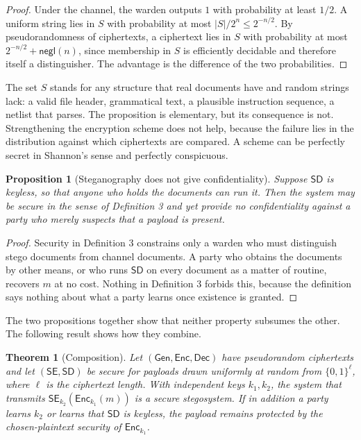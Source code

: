 \documentclass[11pt]{article}
\newtheorem{proposition}{Proposition}
\newtheorem{theorem}{Theorem}
\theoremstyle{definition}
\theoremstyle{remark}
\newcommand{\negl}{\mathsf{negl}}
\newcommand{\Enc}{\mathsf{Enc}}
\newcommand{\Dec}{\mathsf{Dec}}
\newcommand{\SE}{\mathsf{SE}}
\newcommand{\SD}{\mathsf{SD}}
\begin{document}
\begin{proof}
Under the channel, the warden outputs $1$ with probability at least $1/2$. A uniform string lies in $S$ with probability at most $|S|/2^n\le 2^{-n/2}$. By pseudorandomness of ciphertexts, a ciphertext lies in $S$ with probability at most $2^{-n/2}+\negl(n)$, since membership in $S$ is efficiently decidable and therefore itself a distinguisher. The advantage is the difference of the two probabilities.
\end{proof}

The set $S$ stands for any structure that real documents have and random strings lack: a valid file header, grammatical text, a plausible instruction sequence, a netlist that parses. The proposition is elementary, but its consequence is not. Strengthening the encryption scheme does not help, because the failure lies in the distribution against which ciphertexts are compared. A scheme can be perfectly secret in Shannon's sense and perfectly conspicuous.

\begin{proposition}[Steganography does not give confidentiality]
Suppose $\SD$ is keyless, so that anyone who holds the documents can run it. Then the system may be secure in the sense of Definition 3 and yet provide no confidentiality against a party who merely suspects that a payload is present.
\end{proposition}

\begin{proof}
Security in Definition 3 constrains only a warden who must distinguish stego documents from channel documents. A party who obtains the documents by other means, or who runs $\SD$ on every document as a matter of routine, recovers $m$ at no cost. Nothing in Definition 3 forbids this, because the definition says nothing about what a party learns once existence is granted.
\end{proof}

The two propositions together show that neither property subsumes the other. The following result shows how they combine.

\begin{theorem}[Composition]
Let $(\mathsf{Gen},\Enc,\Dec)$ have pseudorandom ciphertexts and let $(\SE,\SD)$ be secure for payloads drawn uniformly at random from $\{0,1\}^{\ell}$, where $\ell$ is the ciphertext length. With independent keys $k_1,k_2$, the system that transmits $\SE_{k_2}(\Enc_{k_1}(m))$ is a secure stegosystem. If in addition a party learns $k_2$ or learns that $\SD$ is keyless, the payload remains protected by the chosen-plaintext security of $\Enc_{k_1}$.
\end{theorem}
\end{document}
